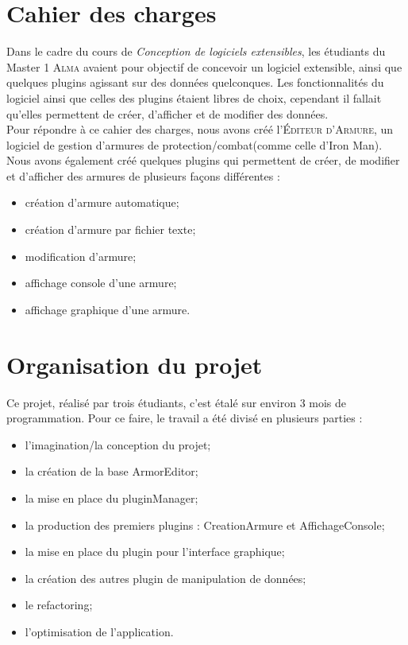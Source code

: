 
\section{Cahier des charges}

Dans le cadre du cours de \textit{Conception de logiciels extensibles}, les étudiants du Master 1 \textsc{Alma} avaient pour objectif de concevoir un logiciel extensible, ainsi que quelques plugins agissant sur des données quelconques. Les fonctionnalités du logiciel ainsi que celles des plugins étaient libres de choix, cependant il fallait qu'elles permettent de créer, d'afficher et de modifier des données.\\

Pour répondre à ce cahier des charges, nous avons créé l'\textsc{\'Editeur d'Armure}, un logiciel de gestion d'armures de protection/combat(comme celle d'Iron Man). Nous avons également créé quelques plugins qui permettent de créer, de modifier et d'afficher des armures de plusieurs façons différentes :
\begin{itemize}
	\item création d'armure automatique;
	\item création d'armure par fichier texte;
	\item modification d'armure;
	\item affichage console d'une armure;
	\item affichage graphique d'une armure.
\end{itemize}


\section{Organisation du projet}

Ce projet, réalisé par trois étudiants, c'est étalé sur environ 3 mois de programmation. Pour ce faire, le travail a été divisé en plusieurs parties :
\begin{itemize}
	\item l'imagination/la conception du projet;
	\item la création de la base ArmorEditor;
	\item la mise en place du pluginManager;
	\item la production des premiers plugins : CreationArmure et AffichageConsole;
	\item la mise en place du plugin pour l'interface graphique;
	\item la création des autres plugin de manipulation de données;
	\item le refactoring;
	\item l'optimisation de l'application.
\end{itemize}
\vspace{0.5cm}

